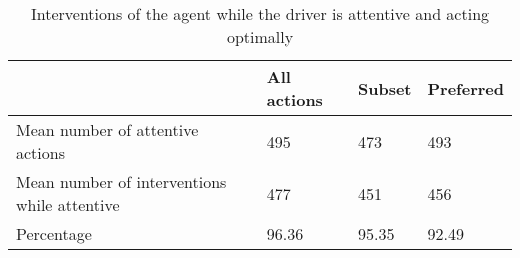 \begin{table}[htbp]
\footnotesize
\centering
\begin{tabular}{@{}llll@{}}
\toprule
                                                & All actions & Subset & Preferred \\ \midrule
Mean number of attentive actions             & 495         & 473    & 493       \\
Mean number of interventions while attentive & 477         & 451    & 456       \\ \midrule
Percentage                                   & 96.36       & 95.35  & 92.49     \\ \bottomrule
\end{tabular}
\caption{Interventions of the agent while the driver is attentive and acting optimally}
\label{tab:driver_autonomy}
\end{table}